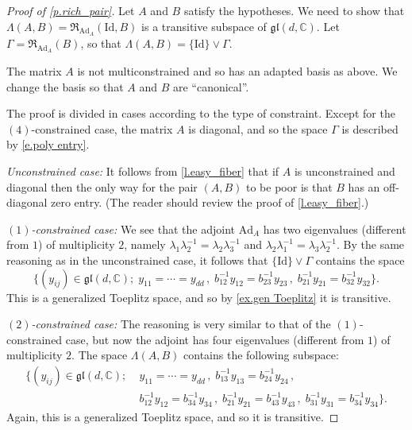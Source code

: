 \documentclass[10pt, a4paper]{amsart}
\theoremstyle{plain}
\theoremstyle{definition}
\theoremstyle{remark}
\theoremstyle{note}
\numberwithin{equation}{section}
\begin{document}
\begin{proof}[Proof of \cref{p.rich_pair}]
Let $A$ and $B$ satisfy the hypotheses.
We need to show that $\Lambda(A,B) = {\mathfrak{R}}_{{\mathrm{Ad}}_A}({\mathrm{Id}},B)$ is a transitive subspace of ${\mathfrak{gl}}(d,{\mathbb{C}})$.
Let $\Gamma = {\mathfrak{R}}_{{\mathrm{Ad}}_A}(B)$,
so that $\Lambda(A,B) = \{{\mathrm{Id}}\} \vee \Gamma$.

The matrix $A$ is not multiconstrained and so has an adapted basis as above.
We change the basis so that $A$ and $B$ are ``canonical''.

The proof is divided in cases according to the type of constraint.
Except for the $(4)$-constrained case, the matrix $A$ is diagonal,
and so the space $\Gamma$ is described by \eqref{e.poly entry}.

\medskip\noindent\emph{Unconstrained case:}
It follows from \cref{l.easy_fiber}
that if $A$ is unconstrained and diagonal then the only way for the pair $(A,B)$ to be poor
is that $B$ has an off-diagonal zero entry.
(The reader should review the proof of \cref{l.easy_fiber}.)

\medskip\noindent\emph{$(1)$-constrained case:}
We see that the adjoint ${\mathrm{Ad}}_A$ has two eigenvalues (different from $1$) 
of multiplicity $2$, namely
$\lambda_1 \lambda_2^{-1} = \lambda_2 \lambda_3^{-1}$ and 
$\lambda_2 \lambda_1^{-1} = \lambda_3 \lambda_2^{-1}$.
By the same reasoning as in the unconstrained case, it follows that $\{{\mathrm{Id}}\} \vee \Gamma$ contains the space
$$
\big \{ (y_{ij}) \in {\mathfrak{gl}}(d,{\mathbb{C}}) ; \;  y_{11} = \cdots = y_{dd}\, , \;
b_{12}^{-1} y_{12} = b_{23}^{-1} y_{23}\, , \;  
b_{21}^{-1} y_{21} = b_{32}^{-1} y_{32}
\big \}.
$$
This is a generalized Toeplitz space, 
and so by \cref{ex.gen Toeplitz} it is transitive.

\medskip\noindent\emph{$(2)$-constrained case:}
The reasoning is very similar to that of the $(1)$-constrained case,
but now the adjoint has four eigenvalues (different from $1$) of multiplicity $2$.
The space $\Lambda(A,B)$ contains the following subspace:
\begin{align*}
\big \{ (y_{ij}) \in {\mathfrak{gl}}(d,{\mathbb{C}}) ; \;	
&y_{11} = \cdots = y_{dd}\, , \; 
 b_{13}^{-1} y_{13} = b_{24}^{-1} y_{24}\, , \\
&b_{12}^{-1} y_{12} = b_{34}^{-1} y_{34}\, , \; 
 b_{21}^{-1} y_{21} = b_{43}^{-1} y_{43}\, , \;
 b_{31}^{-1} y_{31} = b_{34}^{-1} y_{34}
\big \}.
\end{align*}
Again, this is a generalized Toeplitz space, 
and so it is transitive.


\end{proof}
\end{document}
